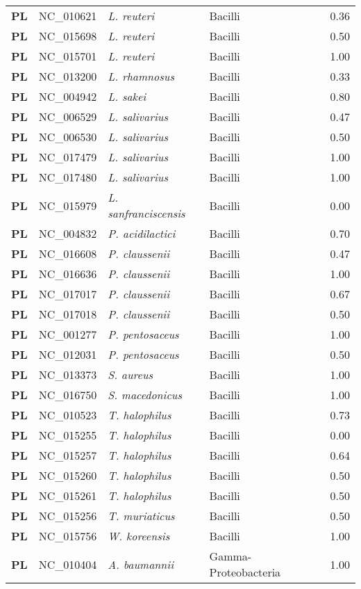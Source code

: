 \begin{adjustwidth}{-3cm}{2cm}
{\begin{supertabular}{>{\bfseries}l|p{0.1\textwidth}p{0.14\textwidth}l|l}
PL & NC\_010621 & \textit{L. reuteri} & Bacilli & 0.36\\
PL & NC\_015698 & \textit{L. reuteri} & Bacilli & 0.50\\
PL & NC\_015701 & \textit{L. reuteri} & Bacilli & 1.00\\
PL & NC\_013200 & \textit{L. rhamnosus} & Bacilli & 0.33\\
PL & NC\_004942 & \textit{L. sakei} & Bacilli & 0.80\\
PL & NC\_006529 & \textit{L. salivarius} & Bacilli & 0.47\\
PL & NC\_006530 & \textit{L. salivarius} & Bacilli & 0.50\\
PL & NC\_017479 & \textit{L. salivarius} & Bacilli & 1.00\\
PL & NC\_017480 & \textit{L. salivarius} & Bacilli & 1.00\\
PL & NC\_015979 & \textit{L. sanfranciscensis} & Bacilli & 0.00\\
PL & NC\_004832 & \textit{P. acidilactici} & Bacilli & 0.70\\
PL & NC\_016608 & \textit{P. claussenii} & Bacilli & 0.47\\
PL & NC\_016636 & \textit{P. claussenii} & Bacilli & 1.00\\
PL & NC\_017017 & \textit{P. claussenii} & Bacilli & 0.67\\
PL & NC\_017018 & \textit{P. claussenii} & Bacilli & 0.50\\
PL & NC\_001277 & \textit{P. pentosaceus} & Bacilli & 1.00\\
PL & NC\_012031 & \textit{P. pentosaceus} & Bacilli & 0.50\\
PL & NC\_013373 & \textit{S. aureus} & Bacilli & 1.00\\
PL & NC\_016750 & \textit{S. macedonicus} & Bacilli & 1.00\\
PL & NC\_010523 & \textit{T. halophilus} & Bacilli & 0.73\\
PL & NC\_015255 & \textit{T. halophilus} & Bacilli & 0.00\\
PL & NC\_015257 & \textit{T. halophilus} & Bacilli & 0.64\\
PL & NC\_015260 & \textit{T. halophilus} & Bacilli & 0.50\\
PL & NC\_015261 & \textit{T. halophilus} & Bacilli & 0.50\\
PL & NC\_015256 & \textit{T. muriaticus} & Bacilli & 0.50\\
PL & NC\_015756 & \textit{W. koreensis} & Bacilli & 1.00\\
PL & NC\_010404 & \textit{A. baumannii} & Gamma-Proteobacteria & 1.00\\

\end{supertabular}}
\end{adjustwidth}
